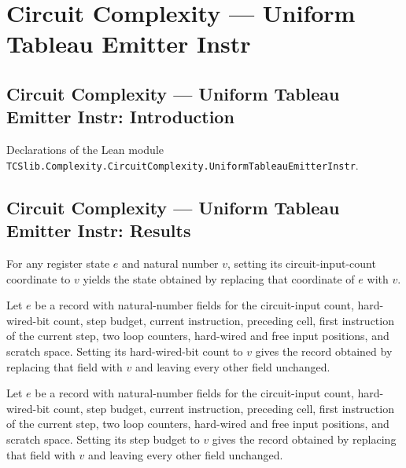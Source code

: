 \section{Circuit Complexity --- Uniform Tableau Emitter Instr}
\subsection*{Circuit Complexity --- Uniform Tableau Emitter Instr: Introduction}

Declarations of the Lean module \texttt{TCSlib.Complexity.CircuitComplexity.UniformTableauEmitterInstr}.

\subsection*{Circuit Complexity --- Uniform Tableau Emitter Instr: Results}

\begin{theorem}
\label{Complexity.UTab.ER.set_nc}
\leanok
{}
For any register state $e$ and natural number $v$, setting its circuit-input-count
coordinate to $v$ yields the state obtained by replacing that coordinate of $e$ with
$v$.
\end{theorem}

\begin{theorem}
\label{Complexity.UTab.ER.set_z}
\leanok
{}
Let $e$ be a record with natural-number fields for the circuit-input count,
hard-wired-bit count, step budget, current instruction, preceding cell, first
instruction of the current step, two loop counters, hard-wired and free input positions,
and scratch space. Setting its hard-wired-bit count to $v$ gives the record obtained by
replacing that field with $v$ and leaving every other field unchanged.
\end{theorem}

\begin{theorem}
\label{Complexity.UTab.ER.set_t}
\leanok
{}
Let $e$ be a record with natural-number fields for the circuit-input count,
hard-wired-bit count, step budget, current instruction, preceding cell, first
instruction of the current step, two loop counters, hard-wired and free input positions,
and scratch space. Setting its step budget to $v$ gives the record obtained by replacing
that field with $v$ and leaving every other field unchanged.
\end{theorem}

